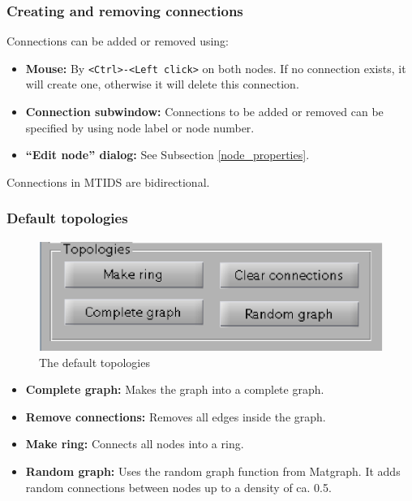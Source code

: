 \documentclass[a4paper,twoside, openright,12pt]{report}
\begin{document}
\subsubsection{Creating and removing connections}

Connections can be added or removed using:
\begin{itemize}
\item \textbf{Mouse:} By \verb|<Ctrl>-<Left click>| on both nodes. If no connection exists, it will create one, otherwise it will delete this connection. 
\item \textbf{Connection subwindow:} Connections to be added or removed can be specified by using node label or node number. 
\item \textbf{``Edit node'' dialog:} See Subsection \ref{node_properties}.
\end{itemize}


Connections in MTIDS are bidirectional.

\subsubsection{Default topologies}

\begin{figure}[h!]
 \centering
 \includegraphics{./pics/mtids-ui-topologies.eps}
 \caption{The default topologies}
 \label{fig:mtids-ui-topologies}
\end{figure}

\begin{itemize}
\item \textbf{Complete graph:} Makes the graph into a complete graph.
\item \textbf{Remove connections:} Removes all edges inside the graph.
\item \textbf{Make ring:} Connects all nodes into a ring.
\item \textbf{Random graph:} Uses the random graph function from Matgraph. It adds random connections between nodes up to a density of ca. 0.5.
\end{itemize}
\end{document}
